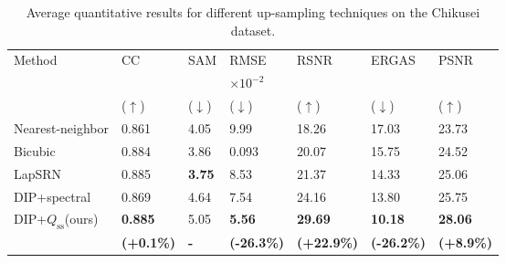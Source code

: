 \documentclass[journal]{IEEEtran}
\begin{document}
    \begin{table}[tb]
        \centering
        \caption{Average quantitative results for different up-sampling techniques on the Chikusei dataset.}
        \begin{tabular}{lp{0.5cm}p{0.6cm}p{0.7cm}p{0.6cm}p{0.7cm}p{0.6cm}}
        \hline
        \multirow{3}{*}{Method} & CC   & SAM & RMSE  & RSNR   & ERGAS       & PSNR \\
        & & & $\times 10^{-2}$ & & & \\
        & ($\uparrow$) & ($\downarrow$) & ($\downarrow$) & ($\uparrow$) & ($\downarrow$) & ($\uparrow$)\\
        \hline
        Nearest-neighbor    & 0.861 & 4.05  & 9.99 & 18.26 & 17.03  & 23.73\\
        Bicubic             & 0.884 & 3.86 & 0.093 & 20.07 & 15.75  & 24.52\\
        LapSRN \cite{LapSRN}& 0.885 & \textbf{3.75}& 8.53  & 21.37  & 14.33 & 25.06\\
        DIP+spectral\cite{DHP-DARN}   & 0.869  & 4.64   & 7.54  & 24.16 & 13.80 & 25.75\\
        DIP+$Q_{\text{ss}}$(ours)  & \textbf{0.885}   & 5.05 & \textbf{5.56} & \textbf{29.69}    & \textbf{10.18}  & \textbf{28.06}\\
                            & \textbf{\tiny(+0.1\%)} &         \textbf{-}          & \textbf{\tiny(-26.3\%)} &    \textbf{\tiny(+22.9\%)} & \textbf{\tiny(-26.2\%)} & \textbf{\tiny(+8.9\%)} \\
        \hline
        \end{tabular}
        \label{tab:chikusei_lambda_tune_qt}
    \end{table}
\end{document}
